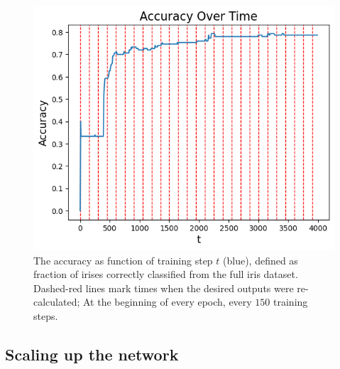 \documentclass[%
 reprint,
 amsmath,amssymb,
 aps,
]{revtex4-2}
\begin{document}
    \begin{figure}[ht]
    \centerline{
    \includegraphics[width=\columnwidth]{Figures/accuracy_vs_t.png}
    }
    \caption{The accuracy as function of training step $t$ (blue), defined as fraction of irises correctly classified from the full iris dataset. Dashed-red lines mark times when the desired outputs were re-calculated; At the beginning of every epoch, every $150$ training steps.}
    \label{fig:accuracy_vs_t}
    \end{figure}    

\subsection{Scaling up the network}\label{sec:scaling_up}
\end{document}

